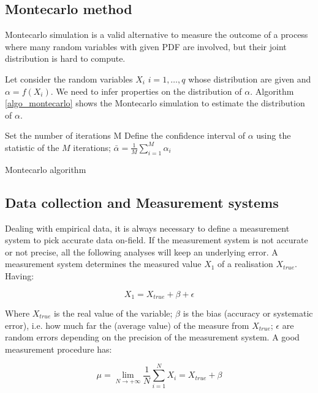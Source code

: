 \subsection{Montecarlo method} \label{secMontecarlo}
Montecarlo simulation is a valid alternative to measure the outcome of a process where many random variables with given PDF are involved, but their joint distribution is hard to compute. \par

Let consider the random variables $X_i$ $i=1,\ldots,q$ whose distribution are given and $\alpha=f(X_i)$. We need to infer properties on the distribution of $\alpha$. Algorithm \ref{algo_montecarlo} shows the Montecarlo simulation to estimate the distribution of $\alpha$. 

\begin{algorithm}[H]
\DontPrintSemicolon
\SetAlgoLined
Set the number of iterations M\;
Define the confidence interval of $\alpha$ using the statistic of the $M$ iterations; $\bar{\alpha}=\frac{1}{M}\sum_{i=1}^{M}\alpha_i$ \;
\caption{Montecarlo algorithm}
\label{algo_montecarlo}
\end{algorithm}

\subsection{Data collection and Measurement systems} \label{secMeasurementSystem}
Dealing with empirical data, it is always necessary to define a measurement system to pick accurate data on-field. If the measurement system is not accurate or not precise, all the following analyses will keep an underlying error. A measurement system determines the measured value $X_1$ of a realisation $X_{true}$. Having:

\begin{equation}
X_1=X_{true}+\beta+\epsilon
\label{eq_measurement1}
\end{equation}

Where $X_{true}$ is the real value of the variable; $\beta$ is the bias (accuracy or systematic error), i.e. how much far the (average value) of the measure from $X_{true}$; $\epsilon$ are random errors depending on the precision of the measurement system. A good measurement procedure has:

\begin{equation}
\mu=\lim_{N \to +\infty}{\frac{1}{N}\sum_{i=1}^{N}{X_i=X_{true}+\beta}}
\label{eq_measurement2}
\end{equation}

